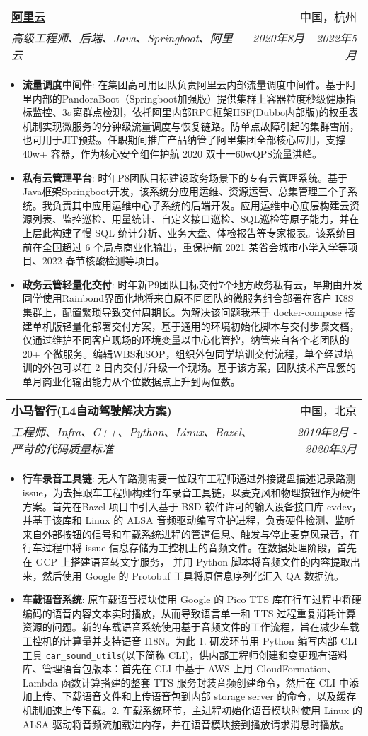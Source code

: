 \documentclass[letterpaper,11pt]{article}
\makeatletter
\newcommand{\resumeItem}[2]{
	\item\small{
		\textbf{#1}{: #2 \vspace{-2pt}}
	}
}
\newcommand{\resumeSubheading}[4]{
	\vspace{-1pt}\item
	\begin{tabular*}{0.97\textwidth}[t]{l@{\extracolsep{\fill}}r}
		\textbf{#1} & #2 \\
		\textit{\small#3} & \textit{\small #4} \\
	\end{tabular*}\vspace{-5pt}
}
\newcommand{\resumeItemListStart}{\begin{itemize}}
\newcommand{\resumeItemListEnd}{\end{itemize}\vspace{-5pt}}
\makeatother
\begin{document}
\begin{spacing}{1.0}
		
		\resumeSubheading
		{\href{https://www.aliyun.com/}{阿里云}}{中国，杭州}
		{高级工程师、后端、Java、Springboot、阿里云}{2020年8月 - 2022年5月}
		\resumeItemListStart
		\resumeItem{流量调度中间件}
		{在集团高可用团队负责阿里云内部流量调度中间件。基于阿里内部的PandoraBoot（Springboot加强版）提供集群上容器粒度秒级健康指标监控、$3\sigma$离群点检测，依托阿里内部RPC框架HSF(Dubbo内部版)的权重表机制实现微服务的分钟级流量调度与恢复链路。防单点故障引起的集群雪崩，也可用于JIT预热。任职期间推广产品纳管了阿里集团全部核心应用，支撑 40w+ 容器，作为核心安全组件护航 2020 双十一60wQPS流量洪峰。}
		\resumeItem{私有云管理平台}
		{时年P8团队目标建设政务场景下的专有云管理系统。基于Java框架Springboot开发，该系统分应用运维、资源运营、总集管理三个子系统。我负责其中应用运维中心子系统的后端开发。应用运维中心底层构建云资源列表、监控巡检、用量统计、自定义接口巡检、SQL巡检等原子能力，并在上层此构建了慢 SQL 统计分析、业务大盘、体检报告等专家报表。该系统目前在全国超过 6 个局点商业化输出，重保护航 2021 某省会城市小学入学等项目、2022 春节核酸检测等项目。}
		\resumeItem{政务云管轻量化交付}
		{时年新P9团队目标交付7个地方政务私有云，早期由开发同学使用Rainbond界面化地将来自原不同团队的微服务组合部署在客户 K8S 集群上，配置繁琐导致交付周期长。为解决该问题我基于 docker-compose 搭建单机版轻量化部署交付方案，基于通用的环境初始化脚本与交付步骤文档，仅通过维护不同客户现场的环境变量以中心化管控，纳管来自各个老团队的 20+ 个微服务。编辑WBS和SOP，组织外包同学培训交付流程，单个经过培训的外包可以在 2 日内交付/升级一个现场。基于该方案，团队技术产品簇的单月商业化输出能力从个位数据点上升到两位数。}
		\resumeItemListEnd
		
		\resumeSubheading
		{\href{https://pony.ai/?lang=zh}{小马智行}(L4自动驾驶解决方案)}{中国，北京}
		{工程师、Infra、C++、Python、Linux、Bazel、严苛的代码质量标准}{2019年2月 - 2020年3月}
		\resumeItemListStart
		\resumeItem{行车录音工具链}
		{无人车路测需要一位跟车工程师通过外接键盘描述记录路测 issue，为去掉跟车工程师构建行车录音工具链，以麦克风和物理按钮作为硬件方案。首先在Bazel 项目中引入基于 BSD 软件许可的输入设备接口库 evdev，并基于该库和 Linux 的 ALSA 音频驱动编写守护进程，负责硬件检测、监听来自外部按钮的信号和车载系统进程的管道信息、触发与停止麦克风录音，在行车过程中将 issue 信息存储为工控机上的音频文件。在数据处理阶段，首先在 GCP 上搭建语音转文字服务， 并用 Python 脚本将音频文件的内容提取出来，然后使用 Google 的 Protobuf 工具将原信息序列化汇入 QA 数据流。}
		\resumeItem{车载语音系统}
		{原车载语音模块使用 Google 的 Pico TTS 库在行车过程中将硬编码的语音内容文本实时播放，从而导致语言单一和 TTS 过程重复消耗计算资源的问题。新的车载语音系统使用基于音频文件的工作流程，旨在减少车载工控机的计算量并支持语音 I18N。为此 1. 研发环节用 Python 编写内部 CLI 工具 \texttt{car\_sound\_utils}(以下简称 CLI)，供内部工程师创建和变更现有语料库、管理语音包版本：首先在 CLI 中基于 AWS 上用 CloudFormation、Lambda 函数计算搭建的整套 TTS 服务封装音频创建命令，然后在 CLI 中添加上传、下载语音文件和上传语音包到内部 storage server 的命令，以及缓存机制加速上传下载。2. 车载系统环节，主进程初始化语音模块时使用 Linux 的 ALSA 驱动将音频流加载进内存，并在语音模块接到播放请求消息时播放。}
		\resumeItemListEnd
		

\end{spacing}
\end{document}
